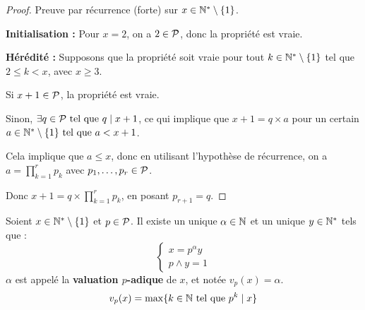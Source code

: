 \documentclass[12pt, a4paper]{report}
\begin{document}
\begin{proof}
    Preuve par récurrence (forte) sur $x\in\mathbb{N}^*\setminus\{1\}$.

    \textbf{Initialisation :} Pour $x=2$, on a $2 \in \mathcal{P}$, donc la propriété est vraie.

    \textbf{Hérédité :} Supposons que la propriété soit vraie pour tout $k \in \mathbb{N}^*\setminus\{1\}$ tel que $2 \le k < x$, avec $x \ge 3$.

    Si $x+1 \in \mathcal{P}$, la propriété est vraie.

    Sinon, $\exists q \in \mathcal{P} \text{ tel que } q \mid x+1$, ce qui implique que $x+1 = q \times a$ pour un certain $a \in \mathbb{N}^*\setminus\{1\} \text{ tel que } a < x+1$.

    Cela implique que $a\le x$, donc en utilisant l'hypothèse de récurrence, on a $a = \prod_{k=1}^{r} p_k$ avec $p_1,\dots,p_r \in \mathcal{P}$.

    Donc $x+1 = q \times \prod_{k=1}^{r} p_k$, en posant $p_{r+1} = q$.
\end{proof}

\begin{definition}
    Soient $x \in \mathbb{N}^*\setminus\{1\}$ et $p \in \mathcal{P}$.
    Il existe un unique $\alpha \in \mathbb{N}$ et un unique $y \in \mathbb{N}^*$ tels que :
    $$\begin{cases}
        x = p^{\alpha} y\\
        p \wedge y = 1
    \end{cases}$$
    $\alpha$ est appelé la \textbf{valuation $p$-adique} de $x$, et notée $v_p(x)=\alpha$.
    $$v_p(x) = \max\{k \in \mathbb{N} \text{ tel que } p^k \mid x\}$$
\end{definition}
\end{document}
